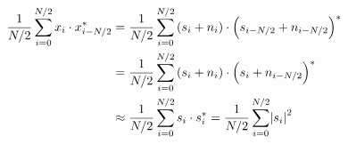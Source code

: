 \begin{varwidth}{10cm}
  \begin{align*}
    \label{eq:sc_peak}
    \frac{1}{N/2} \sum_{i=0}^{N/2} x_{i} \cdot x_{i-N/2}^\ast &=
    \frac{1}{N/2} \sum_{i=0}^{N/2} \left(s_{i} + n_{i} \right) \cdot \left(s_{i-N/2} + n_{i-N/2} \right)^\ast \nonumber \\
    &= \frac{1}{N/2} \sum_{i=0}^{N/2} \left(s_{i} + n_{i} \right) \cdot \left(s_{i} + n_{i-N/2} \right)^\ast \nonumber \\
    &\approx \frac{1}{N/2} \sum_{i=0}^{N/2} s_{i} \cdot s_{i}^\ast
    = \frac{1}{N/2} \sum_{i=0}^{N/2} \abs{s_{i}}^2
  \end{align*}
\end{varwidth}
